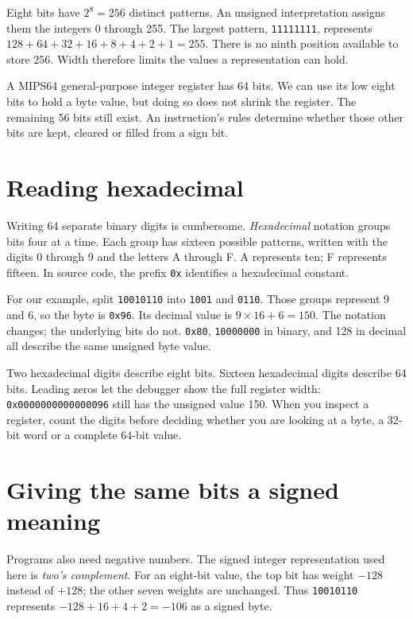 Eight bits have $2^8=256$ distinct patterns. An unsigned interpretation assigns
them the integers 0 through 255. The largest pattern, \texttt{11111111}, represents
$128+64+32+16+8+4+2+1=255$. There is no ninth position available to store 256.
Width therefore limits the values a representation can hold.

A MIPS64 general-purpose integer register has 64 bits. We can use its low eight
bits to hold a byte value, but doing so does not shrink the register. The remaining
56 bits still exist. An instruction's rules determine whether those other bits
are kept, cleared or filled from a sign bit.

\section{Reading hexadecimal}

Writing 64 separate binary digits is cumbersome. \emph{Hexadecimal} notation groups
bits four at a time. Each group has sixteen possible patterns, written with the
digits 0 through 9 and the letters A through F. A represents ten; F represents
fifteen. In source code, the prefix \texttt{0x} identifies a hexadecimal constant.

For our example, split \texttt{10010110} into \texttt{1001} and \texttt{0110}.
Those groups represent 9 and 6, so the byte is \texttt{0x96}. Its decimal value is
$9\times16+6=150$. The notation changes; the underlying bits do not.
\texttt{0x80}, \texttt{10000000} in binary, and 128 in decimal all describe the
same unsigned byte value.

Two hexadecimal digits describe eight bits. Sixteen hexadecimal digits describe
64 bits. Leading zeros let the debugger show the full register width:
\texttt{0x0000000000000096} still has the unsigned value 150. When you inspect a
register, count the digits before deciding whether you are looking at a byte,
a 32-bit word or a complete 64-bit value.

\section{Giving the same bits a signed meaning}

Programs also need negative numbers. The signed integer representation used here
is \emph{two's complement}. For an eight-bit value, the top bit has weight $-128$
instead of $+128$; the other seven weights are unchanged. Thus
\texttt{10010110} represents $-128+16+4+2=-106$ as a signed byte.

